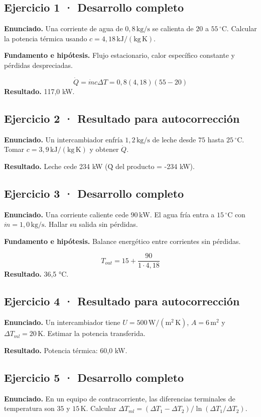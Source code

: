 \documentclass[11pt,a4paper]{article}
\begin{document}
\subsection*{Ejercicio 1 · Desarrollo completo}
\textbf{Enunciado.} Una corriente de agua de \(0{,}8\,\mathrm{kg/s}\) se calienta de \(20\) a \(55\,^\circ\mathrm C\). Calcular la potencia térmica usando \(c=4{,}18\,\mathrm{kJ/(kg\,K)}\).

\textbf{Fundamento e hipótesis.} Flujo estacionario, calor específico constante y pérdidas despreciadas.

\[
\dot Q=\dot mc\Delta T=0{,}8(4{,}18)(55-20)
\]
\textbf{Resultado.} 117,0 kW.


\subsection*{Ejercicio 2 · Resultado para autocorrección}
\textbf{Enunciado.} Un intercambiador enfría \(1{,}2\,\mathrm{kg/s}\) de leche desde \(75\) hasta \(25\,^\circ\mathrm C\). Tomar \(c=3{,}9\,\mathrm{kJ/(kg\,K)}\) y obtener \(\dot Q\).

\textbf{Resultado.} Leche cede 234 kW (Q̇ del producto = -234 kW).


\subsection*{Ejercicio 3 · Desarrollo completo}
\textbf{Enunciado.} Una corriente caliente cede \(90\,\mathrm{kW}\). El agua fría entra a \(15\,^\circ\mathrm C\) con \(\dot m=1{,}0\,\mathrm{kg/s}\). Hallar su salida sin pérdidas.

\textbf{Fundamento e hipótesis.} Balance energético entre corrientes sin pérdidas.

\[
T_{out}=15+\frac{90}{1\cdot4{,}18}
\]
\textbf{Resultado.} 36,5 °C.


\subsection*{Ejercicio 4 · Resultado para autocorrección}
\textbf{Enunciado.} Un intercambiador tiene \(U=500\,\mathrm{W/(m^2\,K)}\), \(A=6\,\mathrm m^2\) y \(\Delta T_{ml}=20\,\mathrm K\). Estimar la potencia transferida.

\textbf{Resultado.} Potencia térmica: 60,0 kW.


\subsection*{Ejercicio 5 · Desarrollo completo}
\textbf{Enunciado.} En un equipo de contracorriente, las diferencias terminales de temperatura son \(35\) y \(15\,\mathrm K\). Calcular \(\Delta T_{ml}=(\Delta T_1-\Delta T_2)/\ln(\Delta T_1/\Delta T_2)\).
\end{document}
